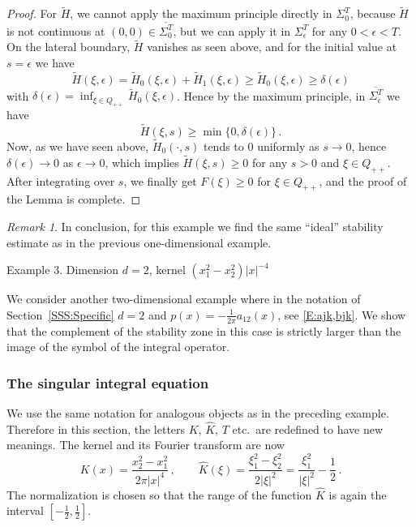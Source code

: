\documentclass[12pt]{amsart}
\makeatletter
\def\subsection{\@startsection{section}{1}%
  \z@{1.2\linespacing\@plus\linespacing}{.5\linespacing}%
  {\normalfont\scshape\centering}}
\def\subsection{\@startsection{subsection}{2}%
  \z@{0.9\linespacing\@plus.7\linespacing}{-.5em}%
  {\normalfont\bfseries}}
\theoremstyle{definition}
\theoremstyle{remark}
\newtheorem{remark}[theorem]{Remark}
\numberwithin{equation}{section}
\let\hat=\widehat
\makeatother
\begin{document}
\begin{proof}
For $\tilde H$, we cannot apply the maximum principle directly in $\Sigma_{0}^{T}$, because $\tilde H$ is not continuous at $(0,0)\in\overline{\Sigma_{0}^{T}}$, but we can apply it in
$\Sigma_{\epsilon}^{T}$ for any $0<\epsilon<T$. On the lateral boundary, $\tilde H$ vanishes as seen above, and for the initial value at $s=\epsilon$ we have
$$
 \tilde H(\xi,\epsilon) = \tilde H_{0}(\xi,\epsilon) + \tilde H_{1}(\xi,\epsilon)
 \ge \tilde H_{0}(\xi,\epsilon) \ge \delta(\epsilon)
$$
with $\delta(\epsilon)=\inf_{\xi\in Q_{++}}\tilde H_{0}(\xi,\epsilon)$.
Hence by the maximum principle, in $\overline{\Sigma_{\epsilon}^{T}}$ we have 
$$
 \tilde H(\xi,s) \ge \min\{0,\delta(\epsilon)\}\,.
$$
Now, as we have seen above, $\tilde H_{0}(\cdot,s)$ tends to $0$ uniformly as $s\to0$, hence $\delta(\epsilon)\to0$ as $\epsilon\to0$, which implies $\tilde H(\xi,s)\ge0$ for any $s>0$ and $\xi\in Q_{++}$. After integrating over $s$, we finally get $F(\xi)\ge0$ for $\xi\in Q_{++}$, and the proof of the Lemma is complete.
\end{proof}

\begin{remark}
 \label{R:idealEx2}
 In conclusion, for this example we find the same ``ideal'' stability estimate as in the previous one-dimensional example.
\end{remark}


\label{Ex:3}
\subsection{Example 3. Dimension $d=2$, kernel $(x_{1}^{2}-x_{2}^{2})|x|^{-4}$}\label{SS:2da12}\ 

We consider another two-dimensional example where in the notation of Section~\ref{SSS:Specific} $d=2$ and $p(x)=-\frac1{2\pi} a_{12}(x)$, see \eqref{E:ajk,bjk}. 
We show that the complement of the stability zone in this case is strictly larger than the image of the symbol of the integral operator.

\subsubsection{The singular integral equation}\label{SSS:SIOEx3}
We use the same notation for analogous objects as in the preceding example. Therefore in this section, the letters $K$, $\hat K$, $T$ etc.\ are redefined to have new meanings.
The kernel and its Fourier transform are now
\begin{equation}
\label{E:KandKhatfora}
 K(x) = \frac{x_{2}^{2}-x_{1}^{2}}{2\pi|x|^{4}}\,,\qquad
 \hat K(\xi) = \frac{\xi_{1}^{2}-\xi_{2}^{2}}{2|\xi|^{2}}
   = \frac{\xi_{1}^{2}}{|\xi|^{2}} - \frac12\,.
\end{equation}
The normalization is chosen so that the range of the function $\hat K$ is again the interval 
$[-\frac12,\frac12]$. 
\end{document}
